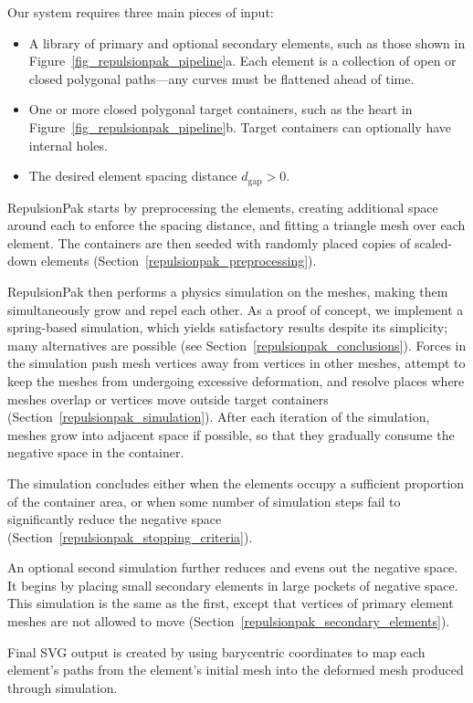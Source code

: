 Our system requires three main pieces of input:
\begin{itemize}
	\item A library of primary and optional secondary elements, such
		as those shown in Figure~\ref{fig_repulsionpak_pipeline}a.
	      Each element is a collection of 
		  open or closed polygonal paths---any curves must
		  be flattened ahead of time.
	\item One or more closed polygonal target containers, such as the
		heart in Figure~\ref{fig_repulsionpak_pipeline}b.  Target containers can optionally
		have internal holes.
	\item The desired element spacing distance $d_\mathrm{gap}>0$.
\end{itemize}

RepulsionPak starts by preprocessing the elements, creating additional space around
each to enforce the spacing distance, and fitting a triangle mesh over each element.
The containers are then seeded with randomly placed
copies of scaled-down elements 
(Section~\ref{repulsionpak_preprocessing}).

RepulsionPak then performs a physics simulation on the meshes, 
making them simultaneously grow and repel each other. As a
proof of concept, we implement a spring-based 
simulation, which yields satisfactory results despite its simplicity;
many alternatives are possible 
(see Section~\ref{repulsionpak_conclusions}).
Forces in the simulation push mesh vertices away from vertices in other meshes,
attempt to keep the meshes from undergoing excessive deformation, and resolve
places where meshes overlap or vertices move outside target containers
(Section~\ref{repulsionpak_simulation}).
After each iteration of the simulation, meshes grow into adjacent space
if possible, so that they gradually consume the negative space in the container.

The simulation concludes 
either when the elements occupy a sufficient proportion of the container area, or 
when some number of simulation steps fail to
significantly reduce the negative space
(Section~\ref{repulsionpak_stopping_criteria}).

An optional second simulation further reduces and evens out the
negative space.  It begins by placing small secondary elements in large
pockets of negative space.  This simulation is the same as the
first, except that vertices of primary element meshes are not allowed to move
(Section~\ref{repulsionpak_secondary_elements}).

Final SVG output is created by using barycentric coordinates to map each element's
paths from the element's initial mesh into the deformed mesh produced through
simulation.


